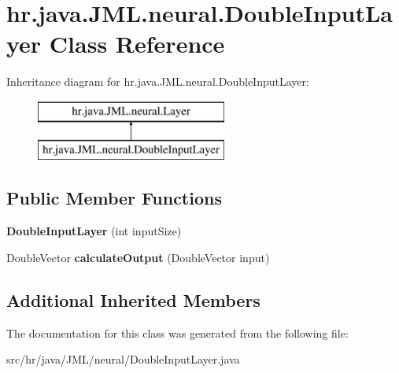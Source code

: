 \hypertarget{classhr_1_1java_1_1_j_m_l_1_1neural_1_1_double_input_layer}{\section{hr.\+java.\+J\+M\+L.\+neural.\+Double\+Input\+Layer Class Reference}
\label{classhr_1_1java_1_1_j_m_l_1_1neural_1_1_double_input_layer}
}
Inheritance diagram for hr.\+java.\+J\+M\+L.\+neural.\+Double\+Input\+Layer\+:\begin{figure}[H]
\begin{center}
\leavevmode
\includegraphics[height=2.000000cm]{classhr_1_1java_1_1_j_m_l_1_1neural_1_1_double_input_layer}
\end{center}
\end{figure}
\subsection*{Public Member Functions}
\begin{DoxyCompactItemize}
\item 
\hypertarget{classhr_1_1java_1_1_j_m_l_1_1neural_1_1_double_input_layer_a01f1be70667315d831804a9ca7ee0169}{{\bfseries Double\+Input\+Layer} (int input\+Size)}\label{classhr_1_1java_1_1_j_m_l_1_1neural_1_1_double_input_layer_a01f1be70667315d831804a9ca7ee0169}

\item 
\hypertarget{classhr_1_1java_1_1_j_m_l_1_1neural_1_1_double_input_layer_a559a54af247c046ddf45fb7e6945313c}{Double\+Vector {\bfseries calculate\+Output} (Double\+Vector input)}\label{classhr_1_1java_1_1_j_m_l_1_1neural_1_1_double_input_layer_a559a54af247c046ddf45fb7e6945313c}

\end{DoxyCompactItemize}
\subsection*{Additional Inherited Members}


The documentation for this class was generated from the following file\+:\begin{DoxyCompactItemize}
\item 
src/hr/java/\+J\+M\+L/neural/Double\+Input\+Layer.\+java\end{DoxyCompactItemize}
